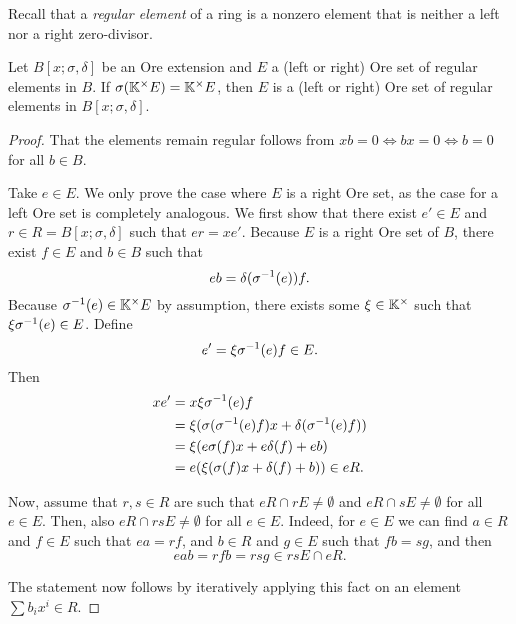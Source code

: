 Recall that a \emph{regular element} of a ring is a nonzero
element that is neither a left nor a right zero-divisor.
\begin{lemma}\label{lem:ore_set_ore_extension}
	Let $B[x;\sigma,\delta]$ be an Ore extension and $E$ a (left or right) Ore set of
	regular elements in $B$. If $\sigma(\mathbb{K}^\times E) = \mathbb{K}^\times E$, then $E$ is a
	(left or right) Ore set of regular elements in $B[x;\sigma, \delta]$.
\end{lemma}
\begin{proof}
	That the elements remain regular follows from $x b = 0 \iff b x = 0 \iff b = 0$ for all
	$b \in B$.

	Take $e \in E$. We only prove the case where $E$ is a right Ore set, as the case for a
	left Ore set is completely analogous. We first show that there exist $e' \in E$ and $r
		\in R = B[x; \sigma, \delta]$ such that $er = x e'$. Because $E$ is a right Ore set of
	$B$, there exist $f\in E$ and $b \in B$ such that
	\begin{equation*}
		e b = \delta(\sigma^{-1}(e))f.
	\end{equation*}
	Because $\sigma^{-1}(e) \in \mathbb{K}^\times E$ by assumption, there exists some $\xi \in \mathbb{K}^\times$ such that $\xi \sigma^{-1}(e) \in E$.
	Define
	\begin{equation*}
		e' = \xi \sigma^{-1}(e)f \in E.
	\end{equation*}
	Then
	\begin{align*}
		xe' & = x\xi\sigma^{-1}(e)f                                     \\
		    & = \xi (\sigma(\sigma^{-1}(e)f)x + \delta(\sigma^{-1}(e)f)) \\
		    & = \xi(e\sigma(f)x + e \delta(f) + e b)                   \\
		    & = e(\xi (\sigma(f)x + \delta(f) + b)) \in eR.
	\end{align*}

	Now, assume that $r,s \in R$ are such that $e R \cap r E \neq \emptyset$ and $e R \cap
		s E \neq \emptyset$ for all $e \in E$. Then, also $e R \cap rs E \neq \emptyset$ for
	all $e\in E$. Indeed, for $e \in E$ we can find $a \in R$ and $f \in E$ such that $ea =
		r f$, and $b \in R$ and $g \in E$ such that $f b = s g$, and then
	\begin{equation*}
		e a b = r f b = r s g \in rs E \cap e R.
	\end{equation*}

	The statement now follows by iteratively applying this fact on an element $\sum b_i x^i
		\in R$.
\end{proof}

